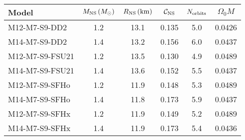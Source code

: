 \begin{tabular}{l ccccc }
	\toprule \toprule
	Model & $M_{\rm NS}\,(M_\odot)$ & $R_{\rm NS}\,({\rm km})$ & $\cal{C}_{\rm NS}$ & $N_{\rm orbits}$ & $\Omega_0 M$ \\
	\midrule
	M12-M7-S9-DD2 & 1.2 & 13.1 & 0.135 & 5.0 & 0.0426\\
	M14-M7-S9-DD2 & 1.4 & 13.2 & 0.156 & 6.0 & 0.0437\\
	M12-M7-S9-FSU21 & 1.2 & 13.5 & 0.130 & 4.9 & 0.0489\\
	M14-M7-S9-FSU21 & 1.4 & 13.6 & 0.152 & 5.5 & 0.0437\\
	M12-M7-S9-SFHo & 1.2 & 11.9 & 0.148 & 5.3 & 0.0489\\
	M14-M7-S9-SFHo & 1.4 & 11.8 & 0.173 & 5.9 & 0.0437\\
	M12-M7-S9-SFHx & 1.2 & 11.9 & 0.149 & 5.2 & 0.0489\\
	M14-M7-S9-SFHx & 1.4 & 11.9 & 0.173 & 5.4 & 0.0436\\
	\bottomrule \bottomrule
\end{tabular}